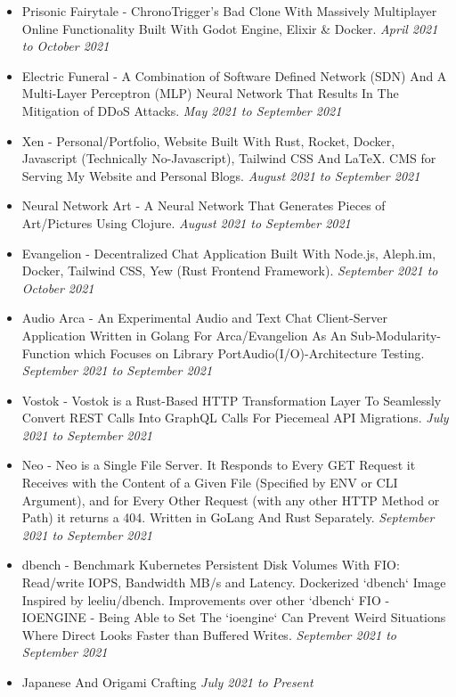\documentclass{myresume}
\begin{document}
       \begin{itemize}
       	\item Prisonic Fairytale - ChronoTrigger's Bad Clone With Massively Multiplayer Online Functionality Built With Godot Engine, Elixir & Docker. \textit{April 2021 to October 2021}
     	\item Electric Funeral - A Combination of Software Defined Network (SDN) And A Multi-Layer Perceptron (MLP) Neural Network That Results In The Mitigation of DDoS Attacks. \textit{May 2021 to September 2021}
     	\item Xen - Personal/Portfolio, Website Built With Rust, Rocket, Docker, Javascript (Technically No-Javascript), Tailwind CSS And \LaTeX{}. CMS for Serving My Website and Personal Blogs. \textit{August 2021 to September 2021}
     	\item Neural Network Art -  A Neural Network That Generates Pieces of Art/Pictures Using Clojure. \textit{August 2021 to September 2021}
     	\item Evangelion - Decentralized Chat Application Built With Node.js, Aleph.im, Docker, Tailwind CSS, Yew (Rust Frontend Framework). \textit{September 2021 to October 2021}
     	\item Audio Arca - An Experimental Audio and Text Chat Client-Server Application Written in Golang For Arca/Evangelion As An Sub-Modularity-Function which Focuses on Library PortAudio(I/O)-Architecture Testing. \textit{September 2021 to September 2021}
     	\item Vostok - Vostok is a Rust-Based HTTP Transformation Layer To Seamlessly Convert REST Calls Into GraphQL Calls For Piecemeal API Migrations. \textit {July 2021 to September 2021}
     	\item Neo - Neo is a Single File Server. It Responds to Every GET Request it Receives with the Content of a Given File (Specified by ENV or CLI Argument), and for Every Other Request (with any other HTTP Method or Path) it returns a 404. Written in GoLang And Rust Separately. \textit {September 2021 to September 2021}
     	\item dbench - Benchmark Kubernetes Persistent Disk Volumes With FIO: Read/write IOPS, Bandwidth MB/s and Latency. Dockerized `dbench` Image Inspired by leeliu/dbench. Improvements over other `dbench` FIO - IOENGINE - Being Able to Set The `ioengine` Can Prevent Weird Situations Where Direct Looks Faster than Buffered Writes. \textit{September 2021 to September 2021}    	
       \end{itemize}   
 
        \begin{itemize}
                \item Japanese And Origami Crafting \textit{July 2021 to Present}
        \end{itemize}
\end{document}
